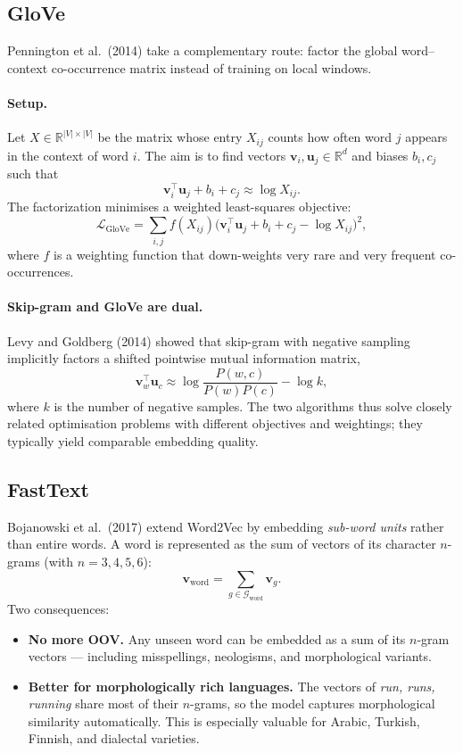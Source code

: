 \documentclass[12pt,a4paper]{report}
\theoremstyle{definition}
\theoremstyle{remark}
\begin{document}
\subsection{GloVe}

Pennington et al.\ (2014) take a complementary route: factor the global word--context co-occurrence matrix instead of training on local windows.

\paragraph{Setup.} Let $X \in \mathbb{R}^{|V| \times |V|}$ be the matrix whose entry $X_{ij}$ counts how often word $j$ appears in the context of word $i$. The aim is to find vectors $\mathbf{v}_i, \mathbf{u}_j \in \mathbb{R}^d$ and biases $b_i, c_j$ such that
\[ \mathbf{v}_i^\top \mathbf{u}_j + b_i + c_j \approx \log X_{ij}. \]
The factorization minimises a weighted least-squares objective:
\[ \mathcal{L}_{\text{GloVe}} = \sum_{i, j} f(X_{ij}) \big( \mathbf{v}_i^\top \mathbf{u}_j + b_i + c_j - \log X_{ij} \big)^2, \]
where $f$ is a weighting function that down-weights very rare and very frequent co-occurrences.

\paragraph{Skip-gram and GloVe are dual.} Levy and Goldberg (2014) showed that skip-gram with negative sampling implicitly factors a shifted pointwise mutual information matrix,
\[ \mathbf{v}_w^\top \mathbf{u}_c \approx \log \frac{P(w, c)}{P(w) P(c)} - \log k, \]
where $k$ is the number of negative samples. The two algorithms thus solve closely related optimisation problems with different objectives and weightings; they typically yield comparable embedding quality.

\subsection{FastText}

Bojanowski et al.\ (2017) extend Word2Vec by embedding \emph{sub-word units} rather than entire words. A word is represented as the sum of vectors of its character $n$-grams (with $n = 3, 4, 5, 6$):
\[ \mathbf{v}_{\text{word}} = \sum_{g \in \mathcal{G}_{\text{word}}} \mathbf{v}_g. \]
Two consequences:
\begin{itemize}
    \item \textbf{No more OOV.} Any unseen word can be embedded as a sum of its $n$-gram vectors --- including misspellings, neologisms, and morphological variants.
    \item \textbf{Better for morphologically rich languages.} The vectors of \emph{run, runs, running} share most of their $n$-grams, so the model captures morphological similarity automatically. This is especially valuable for Arabic, Turkish, Finnish, and dialectal varieties.
\end{itemize}
\end{document}
